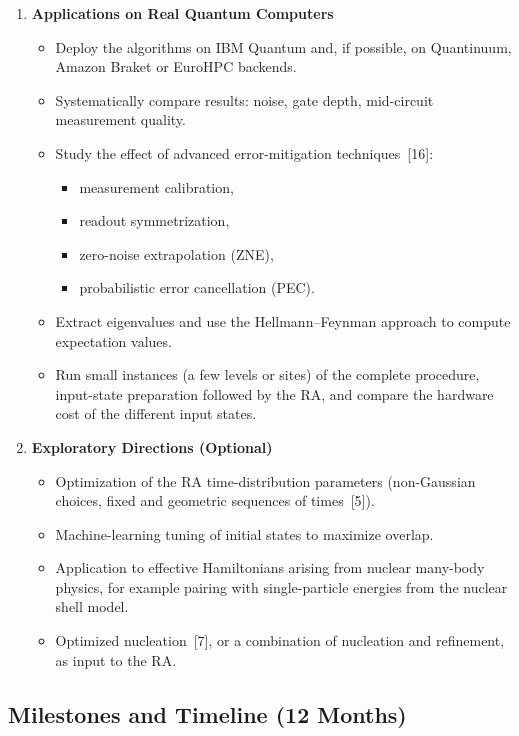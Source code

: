 \documentclass[12pt,a4paper]{article}
\begin{document}
\begin{enumerate}
\item \textbf{Applications on Real Quantum Computers}
  \begin{itemize}
    \item Deploy the algorithms on IBM Quantum and, if possible, on Quantinuum, Amazon Braket or EuroHPC backends.
    \item Systematically compare results: noise, gate depth, mid-circuit measurement quality.
    \item Study the effect of advanced error-mitigation techniques~[16]:
      \begin{itemize}
        \item measurement calibration,
        \item readout symmetrization,
        \item zero-noise extrapolation (ZNE),
        \item probabilistic error cancellation (PEC).
      \end{itemize}
    \item Extract eigenvalues and use the Hellmann--Feynman approach to compute expectation values.
    \item Run small instances (a few levels or sites) of the complete procedure, input-state preparation followed by the RA, and compare the hardware cost of the different input states.
  \end{itemize}

\item \textbf{Exploratory Directions (Optional)}
  \begin{itemize}
    \item Optimization of the RA time-distribution parameters (non-Gaussian choices, fixed and geometric sequences of times~[5]).
    \item Machine-learning tuning of initial states to maximize overlap.
    \item Application to effective Hamiltonians arising from nuclear many-body physics, for example pairing with single-particle energies from the nuclear shell model.
    \item Optimized nucleation~[7], or a combination of nucleation and refinement, as input to the RA.
  \end{itemize}

\end{enumerate}

\subsection*{Milestones and Timeline (12 Months)}
\end{document}
